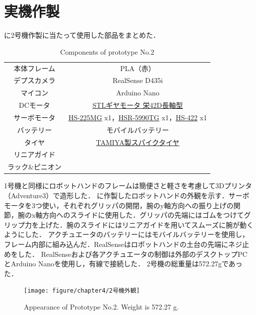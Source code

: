 \section{実機作製}

に2号機作製に当たって使用した部品をまとめた．

\begin{table}[H]
    \centering
    \caption{Components of prototype No.2}
    \begin{tabular}{cc}\toprule
        本体フレーム & PLA（赤） \\
        デプスカメラ & RealSense D435i \\ 
        マイコン & Arduino Nano \\ 
        DCモータ & \href{http://akizukidenshi.com/catalog/g/gM-12379/}{STLギヤモータ 栄42D長軸型} \\ 
        サーボモータ & \href{https://hitecrcd.co.jp/products/servo32225/}{HS-225MG} x1，\href{https://hitecrcd.com/products/servos/discontinued-servos-servo-accessories/hsr-5990tg-hmi-ultra-premium-robot-servo/product}{HSR-5990TG} x1，\href{https://hitecrcd.co.jp/products/servo31422s/}{HS-422} x1 \\ 
        バッテリー & モバイルバッテリー \\ 
        タイヤ & \href{https://tamiya.com/japan/products/70194/index.html}{TAMIYA製スパイクタイヤ} \\
        リニアガイド &  \\
        ラック\&ピニオン &  \\ \bottomrule
    \end{tabular} 
    \label{tab:2号機部品}
\end{table}

1号機と同様にロボットハンドのフレームは簡便さと軽さを考慮して3Dプリンタ（Adventure3）で造形した．
に作製したロボットハンドの外観を示す．サーボモータを3つ使い，それぞれグリッパの開閉，腕のy軸方向への振り上げの関節，腕のx軸方向へのスライドに使用した．グリッパの先端にはゴムをつけてグリップ力を上げた．腕のスライドにはリニアガイドを用いてスムーズに腕が動くようにした．
アクチュエータのバッテリーにはモバイルバッテリーを使用し，フレーム内部に組み込んだ．RealSenseはロボットハンドの土台の先端にネジ止めをした．
RealSenseおよび各アクチュエータの制御は外部のデスクトップPCとArduino Nanoを使用し，有線で接続した．
2号機の総重量は572.27gであった．

\begin{figure}[H]
    \centering
    \texttt{[image: figure/chapter4/2号機外観]}
    \caption{Appearance of Prototype No.2. Weight is 572.27 g.}
    \label{fig:2号機外観}
\end{figure}


